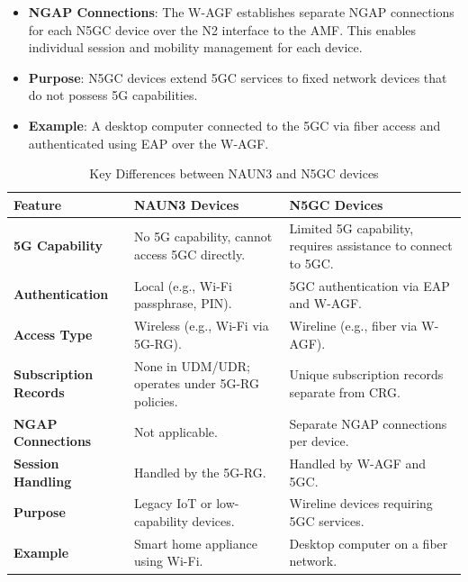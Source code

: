 \begin{itemize}
{\begin{itemize}
{            }
            \item {
                \textbf{\ac{NGAP} Connections}: The \ac{W-AGF} establishes separate \ac{NGAP} connections for each \ac{N5GC} device over the N2 interface to the \ac{AMF}. This enables individual session and mobility management for each device.
            }
            \item {
                \textbf{Purpose}: \ac{N5GC} devices extend \ac{5GC} services to fixed network devices that do not possess \ac{5G} capabilities.
            }
            \item {
                \textbf{Example}: A desktop computer connected to the \ac{5GC} via fiber access and authenticated using \ac{EAP} over the \ac{W-AGF}.
            }
        \end{itemize}    
    }
\end{itemize}

\begin{table}[ht]
    \centering
    \caption{Key Differences between \ac{NAUN3} and \ac{N5GC} devices}
    \label{tab:Key Differences between NAUN3 and N5GC devices}
    \begin{tabularx}{\textwidth} { 
      | >{\raggedright\arraybackslash}X 
      | >{\raggedright\arraybackslash}X 
      | >{\raggedright\arraybackslash}X | }
        \hline
        \textbf{Feature} & \textbf{\ac{NAUN3} Devices} & \textbf{\ac{N5GC} Devices} \\
        \hline
        \textbf{\ac{5G} Capability} & No \ac{5G} capability, cannot access \ac{5GC} directly. & Limited \ac{5G} capability, requires assistance to connect to \ac{5GC}.\\
        \hline
        \textbf{Authentication} & Local (e.g., Wi-Fi passphrase, \ac{PIN}). & \ac{5GC} authentication via \ac{EAP} and \ac{W-AGF}.\\
        \hline
        \textbf{Access Type} & Wireless (e.g., Wi-Fi via \ac{5G-RG}). & Wireline (e.g., fiber via \ac{W-AGF}).\\
        \hline
        \textbf{Subscription Records} & None in \ac{UDM}/\ac{UDR}; operates under \ac{5G-RG} policies. & Unique subscription records separate from \ac{CRG}.\\
        \hline
        \textbf{\ac{NGAP} Connections} & Not applicable. & Separate \ac{NGAP} connections per device.\\
        \hline
        \textbf{Session Handling} & Handled by the \ac{5G-RG}. & Handled by \ac{W-AGF} and \ac{5GC}.\\
        \hline
        \textbf{Purpose} & Legacy \ac{IoT} or low-capability devices. & Wireline devices requiring \ac{5GC} services.\\
        \hline
        \textbf{Example} & Smart home appliance using Wi-Fi. & Desktop computer on a fiber network.\\
        \hline
    \end{tabularx}
\end{table}

